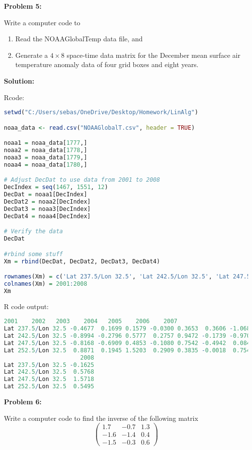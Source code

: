 \documentclass[12pt]{article}
\newenvironment{problem}[1]{
    \textbf{Problem #1:}
}{
    \rmfamily \vspace{1em}
}
\newenvironment{solution}{
    \textbf{Solution:}
    
}{
    
    \vspace{2em}
}
\begin{document}
\begin{problem}{5}
    Write a computer code to
    \begin{enumerate}[label=(\alph*)]
        \item Read the NOAAGlobalTemp data file, and
        \item Generate a \(4 \times 8\) space-time data matrix for the December mean surface air temperature anomaly data of four grid boxes and eight years.
    \end{enumerate}
\end{problem}

\begin{solution}
    Rcode:
    \begin{lstlisting}[language=R]
setwd("C:/Users/sebas/OneDrive/Desktop/Homework/LinAlg")

noaa_data <- read.csv("NOAAGlobalT.csv", header = TRUE)

noaa1 = noaa_data[1777,]
noaa2 = noaa_data[1778,]
noaa3 = noaa_data[1779,]
noaa4 = noaa_data[1780,]

# Adjust DecDat to use data from 2001 to 2008
DecIndex = seq(1467, 1551, 12)
DecDat = noaa1[DecIndex]
DecDat2 = noaa2[DecIndex]
DecDat3 = noaa3[DecIndex]
DecDat4 = noaa4[DecIndex]

# Verify the data
DecDat

#rbind some stuff
Xm = rbind(DecDat, DecDat2, DecDat3, DecDat4)

rownames(Xm) = c('Lat 237.5/Lon 32.5', 'Lat 242.5/Lon 32.5', 'Lat 247.5/Lon 32.5', 'Lat 252.5/Lon 32.5')
colnames(Xm) = 2001:2008
Xm
    \end{lstlisting}
    R code output:
    \begin{lstlisting}[language=R]
        2001    2002   2003    2004   2005    2006    2007
Lat 237.5/Lon 32.5 -0.4677  0.1699 0.1579 -0.0300 0.3653  0.3606 -1.0685
Lat 242.5/Lon 32.5 -0.8994 -0.2796 0.5777  0.2757 0.9472 -0.1739 -0.9703
Lat 247.5/Lon 32.5 -0.8168 -0.6909 0.4853 -0.1080 0.7542 -0.4942  0.0847
Lat 252.5/Lon 32.5  0.8871  0.1945 1.5203  0.2909 0.3835 -0.0018  0.7548
                      2008
Lat 237.5/Lon 32.5 -0.1625
Lat 242.5/Lon 32.5  0.5768
Lat 247.5/Lon 32.5  1.5718
Lat 252.5/Lon 32.5  0.5495
    \end{lstlisting}
\end{solution}

\begin{problem}{6}
    Write a computer code to find the inverse of the following matrix
    \[
        \begin{pmatrix}
            1.7 & -0.7 & 1.3 \\
            -1.6 & -1.4 & 0.4 \\
            -1.5 & -0.3 & 0.6
        \end{pmatrix}
    \]
\end{problem}
\end{document}
